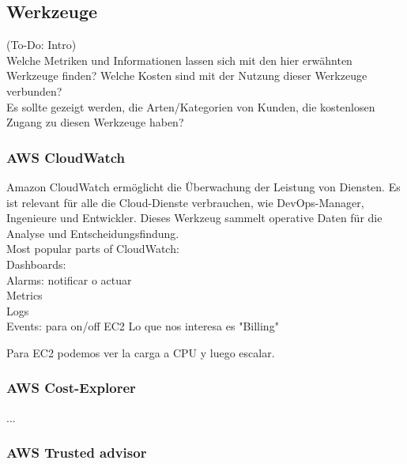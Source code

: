 \subsection{Werkzeuge}
(To-Do: Intro)\\
Welche Metriken und Informationen lassen sich mit den hier erwähnten Werkzeuge finden?
Welche Kosten sind mit der Nutzung dieser Werkzeuge verbunden?
\\
Es sollte gezeigt werden, die Arten/Kategorien von Kunden, die kostenlosen Zugang zu diesen Werkzeuge haben?


\subsubsection{AWS CloudWatch} 

Amazon CloudWatch ermöglicht die Überwachung der Leistung von Diensten. Es ist relevant für alle die Cloud-Dienste verbrauchen, wie DevOps-Manager, Ingenieure und Entwickler. Dieses Werkzeug sammelt operative Daten für die Analyse und Entscheidungsfindung.
\\
Most popular parts of CloudWatch:
\\
Dashboards: 
\\
Alarms: notificar o actuar
\\
Metrics
\\
Logs
\\
Events: para on/off EC2
Lo que nos interesa es "Billing"


Para EC2 podemos ver la carga a CPU y luego escalar.

\subsubsection{AWS Cost-Explorer}
...

\subsubsection{AWS Trusted advisor}


